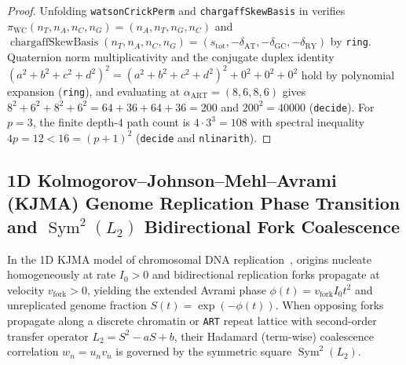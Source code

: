 \documentclass[11pt,a4paper]{article}
\theoremstyle{definition}
\begin{document}
\begin{proof}
Unfolding \texttt{watsonCrickPerm} and \texttt{chargaffSkewBasis} in  verifies $\pi_{\mathrm{WC}}(n_T,n_A,n_C,n_G) = (n_A,n_T,n_G,n_C)$ and $\operatorname{chargaffSkewBasis}(n_T,n_A,n_C,n_G) = (s_{\mathrm{tot}}, -\delta_{\mathrm{AT}}, -\delta_{\mathrm{GC}}, -\delta_{\mathrm{RY}})$ by \texttt{ring}. Quaternion norm multiplicativity and the conjugate duplex identity $(a^2+b^2+c^2+d^2)^2 = (a^2+b^2+c^2+d^2)^2 + 0^2 + 0^2 + 0^2$ hold by polynomial expansion (\texttt{ring}), and evaluating at $\alpha_{\mathrm{ART}} = (8,6,8,6)$ gives $8^2 + 6^2 + 8^2 + 6^2 = 64 + 36 + 64 + 36 = 200$ and $200^2 = 40000$ (\texttt{decide}). For $p = 3$, the finite depth-$4$ path count is $4 \cdot 3^3 = 108$ with spectral inequality $4p = 12 < 16 = (p+1)^2$ (\texttt{decide} and \texttt{nlinarith}).
\end{proof}

\subsection{1D Kolmogorov--Johnson--Mehl--Avrami (KJMA) Genome Replication Phase Transition and $\operatorname{Sym}^2(L_2)$ Bidirectional Fork Coalescence}

In the 1D KJMA model of chromosomal DNA replication~\cite{bechhoefer2005kjma}, origins nucleate homogeneously at rate $I_0 > 0$ and bidirectional replication forks propagate at velocity $v_{\mathrm{fork}} > 0$, yielding the extended Avrami phase $\phi(t) = v_{\mathrm{fork}} I_0 t^2$ and unreplicated genome fraction $S(t) = \exp(-\phi(t))$. When opposing forks propagate along a discrete chromatin or \texttt{ART} repeat lattice with second-order transfer operator $L_2 = S^2 - aS + b$, their Hadamard (term-wise) coalescence correlation $w_n = u_n v_n$ is governed by the symmetric square $\operatorname{Sym}^2(L_2)$.
\end{document}
